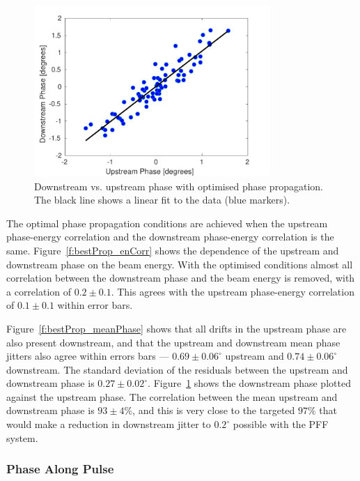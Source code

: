 \begin{figure}
  \centering
  \includegraphics[width=0.8\textwidth]{Figures/propagation/bestProp_meanCorr}
  \caption{Downstream vs. upstream phase with optimised phase propagation. The black line shows a linear fit to the data (blue markers).}
  \label{f:bestProp_meanCorr}
\end{figure}

The optimal phase propagation conditions are achieved when the upstream phase-energy correlation and the downstream phase-energy correlation is the same. Figure~\ref{f:bestProp_enCorr} shows the dependence of the upstream and downstream phase on the beam energy. With the optimised conditions almost all correlation between the downstream phase and the beam energy is removed, with a correlation of \(0.2\pm0.1\). This agrees with the upstream phase-energy correlation of \(0.1\pm0.1\) within error bars.

Figure~\ref{f:bestProp_meanPhase} shows that all drifts in the upstream phase are also present downstream, and that the upstream and downstream mean phase jitters also agree within errors bars --- \(0.69\pm0.06^\circ\) upstream and \(0.74\pm0.06^\circ\) downstream. The standard deviation of the residuals between the upstream and downstream phase is \(0.27\pm0.02^\circ\).%
Figure~\ref{f:bestProp_meanCorr} shows the downstream phase plotted against the upstream phase. The correlation between the mean upstream and downstream phase is \(93\pm4\%\), and this is very close to the targeted \(97\%\) that would make a reduction in downstream jitter to \(0.2^\circ\) possible with the PFF system.


\subsubsection{Phase Along Pulse}

